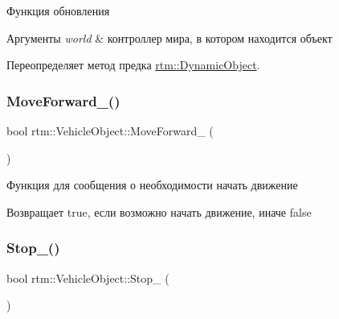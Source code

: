 Функция обновления 


\begin{DoxyParams}{Аргументы}
{\em world} & контроллер мира, в котором находится объект \\
\hline
\end{DoxyParams}


Переопределяет метод предка \hyperlink{classrtm_1_1_dynamic_object_a2b2a4072f80d6be9c8d1097bc072197e}{rtm\+::\+Dynamic\+Object}.

\mbox{\label{classrtm_1_1_vehicle_object_a017a765353387080952f3ef1657c9463}} 
\subsubsection{\texorpdfstring{Move\+Forward\+\_\+()}{MoveForward\_()}}
{\footnotesize\ttfamily bool rtm\+::\+Vehicle\+Object\+::\+Move\+Forward\+\_\+ (\begin{DoxyParamCaption}{ }\end{DoxyParamCaption})\hspace{0.3cm}{\ttfamily [protected]}}



Функция для сообщения о необходимости начать движение 

\begin{DoxyReturn}{Возвращает}
true, если возможно начать движение, иначе false 
\end{DoxyReturn}
\mbox{\label{classrtm_1_1_vehicle_object_a74dd5fb7b16da79e1d288738ba43ded0}} 
\subsubsection{\texorpdfstring{Stop\+\_\+()}{Stop\_()}}
{\footnotesize\ttfamily bool rtm\+::\+Vehicle\+Object\+::\+Stop\+\_\+ (\begin{DoxyParamCaption}{ }\end{DoxyParamCaption})\hspace{0.3cm}{\ttfamily [protected]}}



